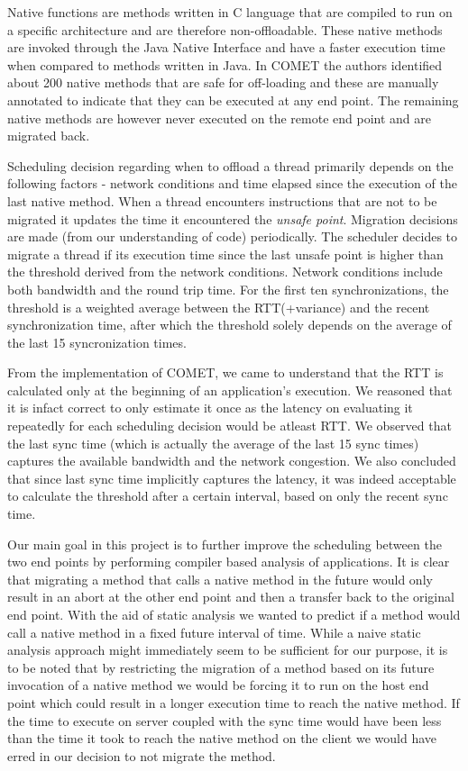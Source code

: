 Native functions are methods written in C language that are compiled to run on a
specific architecture and are therefore non-offloadable. These native methods
are invoked through the Java Native Interface and have a faster execution time when
compared to methods written in Java. In COMET the authors identified about 200
native methods that are safe for off-loading and these are manually annotated to indicate
that they can be executed at any end point. The remaining native methods are
however never executed on the remote end point and are migrated back.

Scheduling decision regarding when to offload a thread primarily depends on the following
factors - network conditions and time elapsed since the execution of the last
native method. When a thread encounters instructions that are not to be migrated it
updates the time it encountered the \textit{unsafe point}. Migration decisions are made (from our
understanding of code) periodically. The scheduler decides to migrate a thread if
its execution time since the last unsafe point is higher than the threshold
derived from the network conditions. Network conditions include both bandwidth and the
round trip time. For the first ten synchronizations, the threshold is a weighted
average between the RTT(+variance) and the recent synchronization time, after which
the threshold solely depends on the average of the last 15 syncronization times.

From the implementation of COMET, we came to understand that the RTT is calculated
only at the beginning of an application's execution. We reasoned that it is infact
correct to only estimate it once as the latency on evaluating it repeatedly for
each scheduling decision would be atleast RTT. We observed that the last sync
time (which is actually the average of the last 15 sync times) captures the
available bandwidth and the network congestion. We also concluded that since
last sync time implicitly captures the latency, it was indeed acceptable to
calculate the threshold after a certain interval, based on only the recent sync time.

Our main goal in this project is to further improve the scheduling
between the two end points by performing compiler based analysis of applications.
It is clear that migrating a method that calls a
native method in the future would only result in an abort at the other end point
and then a transfer back to the original end point. With the aid of static analysis
we wanted to predict if a method would call a native method in a fixed future interval
of time. While a naive static analysis approach might immediately seem to be
sufficient for our purpose, it is to be noted that by restricting the migration of a
method based on its future invocation of a native method we would be forcing it to
run on the host end point which could result in a longer execution time to reach the
native method. If the time to execute on server coupled with the sync time
would have been less than the time it took to reach the native method on the client
we would have erred in our decision to not migrate the method.

